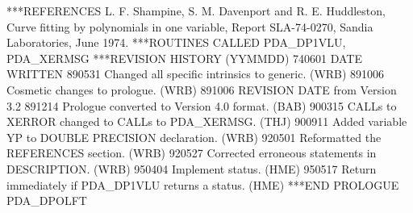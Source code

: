 \documentclass[11pt,twoside,nolof]{starlink}
\begin{document}
\begin{terminalv}
***REFERENCES  L. F. Shampine, S. M. Davenport and R. E. Huddleston,
                 Curve fitting by polynomials in one variable, Report
                 SLA-74-0270, Sandia Laboratories, June 1974.
***ROUTINES CALLED  PDA_DP1VLU, PDA_XERMSG
***REVISION HISTORY  (YYMMDD)
   740601  DATE WRITTEN
   890531  Changed all specific intrinsics to generic.  (WRB)
   891006  Cosmetic changes to prologue.  (WRB)
   891006  REVISION DATE from Version 3.2
   891214  Prologue converted to Version 4.0 format.  (BAB)
   900315  CALLs to XERROR changed to CALLs to PDA_XERMSG.  (THJ)
   900911  Added variable YP to DOUBLE PRECISION declaration.  (WRB)
   920501  Reformatted the REFERENCES section.  (WRB)
   920527  Corrected erroneous statements in DESCRIPTION.  (WRB)
   950404  Implement status.  (HME)
   950517  Return immediately if PDA_DP1VLU returns a status.  (HME)
***END PROLOGUE  PDA_DPOLFT
\end{terminalv}


\end{document}
